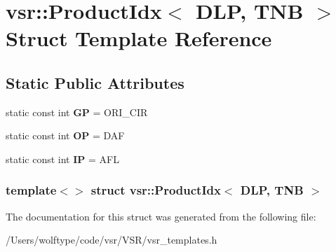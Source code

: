\hypertarget{structvsr_1_1_product_idx_3_01_d_l_p_00_01_t_n_b_01_4}{\section{vsr\-:\-:Product\-Idx$<$ D\-L\-P, T\-N\-B $>$ Struct Template Reference}
\label{structvsr_1_1_product_idx_3_01_d_l_p_00_01_t_n_b_01_4}
}
\subsection*{Static Public Attributes}
\begin{DoxyCompactItemize}
\item 
\hypertarget{structvsr_1_1_product_idx_3_01_d_l_p_00_01_t_n_b_01_4_a81b7a0a274bd7ddd5d6b4d90972d28c7}{static const int {\bfseries G\-P} = O\-R\-I\-\_\-\-C\-I\-R}\label{structvsr_1_1_product_idx_3_01_d_l_p_00_01_t_n_b_01_4_a81b7a0a274bd7ddd5d6b4d90972d28c7}

\item 
\hypertarget{structvsr_1_1_product_idx_3_01_d_l_p_00_01_t_n_b_01_4_a321e721a2c30e3b50925f1872572cb7c}{static const int {\bfseries O\-P} = D\-A\-F}\label{structvsr_1_1_product_idx_3_01_d_l_p_00_01_t_n_b_01_4_a321e721a2c30e3b50925f1872572cb7c}

\item 
\hypertarget{structvsr_1_1_product_idx_3_01_d_l_p_00_01_t_n_b_01_4_a09b70bd608599cd9a84bf61180f8bcac}{static const int {\bfseries I\-P} = A\-F\-L}\label{structvsr_1_1_product_idx_3_01_d_l_p_00_01_t_n_b_01_4_a09b70bd608599cd9a84bf61180f8bcac}

\end{DoxyCompactItemize}
\subsubsection*{template$<$$>$ struct vsr\-::\-Product\-Idx$<$ D\-L\-P, T\-N\-B $>$}



The documentation for this struct was generated from the following file\-:\begin{DoxyCompactItemize}
\item 
/\-Users/wolftype/code/vsr/\-V\-S\-R/vsr\-\_\-templates.\-h\end{DoxyCompactItemize}
